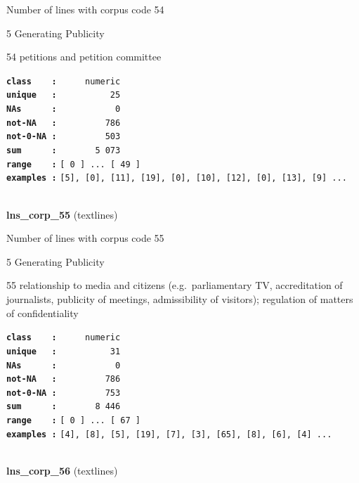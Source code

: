 \documentclass[]{article}
\begin{document}
Number of lines with corpus code 54

5 Generating Publicity

54 petitions and petition committee

\textbf{\texttt{class\ \ \ \ :}} \texttt{~~~~~numeric}\\
\textbf{\texttt{unique\ \ \ :}} \texttt{~~~~~~~~~~25}\\
\textbf{\texttt{NAs\ \ \ \ \ \ :}} \texttt{~~~~~~~~~~~0}\\
\textbf{\texttt{not-NA\ \ \ :}} \texttt{~~~~~~~~~786}\\
\textbf{\texttt{not-0-NA\ :}} \texttt{~~~~~~~~~503}\\
\textbf{\texttt{sum\ \ \ \ \ \ :}} \texttt{~~~~~~~5~073}\\
\textbf{\texttt{range\ \ \ \ :}}
\texttt{{[}\ 0\ {]}\ ...\ {[}\ 49\ {]}}\\
\textbf{\texttt{examples\ :}}
\texttt{{[}5{]},\ {[}0{]},\ {[}11{]},\ {[}19{]},\ {[}0{]},\ {[}10{]},\ {[}12{]},\ {[}0{]},\ {[}13{]},\ {[}9{]}\ ...}\\

~

\textbf{lns\_corp\_55} (textlines)

Number of lines with corpus code 55

5 Generating Publicity

55 relationship to media and citizens (e.g.~parliamentary TV,
accreditation of journalists, publicity of meetings, admissibility of
visitors); regulation of matters of confidentiality

\textbf{\texttt{class\ \ \ \ :}} \texttt{~~~~~numeric}\\
\textbf{\texttt{unique\ \ \ :}} \texttt{~~~~~~~~~~31}\\
\textbf{\texttt{NAs\ \ \ \ \ \ :}} \texttt{~~~~~~~~~~~0}\\
\textbf{\texttt{not-NA\ \ \ :}} \texttt{~~~~~~~~~786}\\
\textbf{\texttt{not-0-NA\ :}} \texttt{~~~~~~~~~753}\\
\textbf{\texttt{sum\ \ \ \ \ \ :}} \texttt{~~~~~~~8~446}\\
\textbf{\texttt{range\ \ \ \ :}}
\texttt{{[}\ 0\ {]}\ ...\ {[}\ 67\ {]}}\\
\textbf{\texttt{examples\ :}}
\texttt{{[}4{]},\ {[}8{]},\ {[}5{]},\ {[}19{]},\ {[}7{]},\ {[}3{]},\ {[}65{]},\ {[}8{]},\ {[}6{]},\ {[}4{]}\ ...}\\

~

\textbf{lns\_corp\_56} (textlines)
\end{document}
